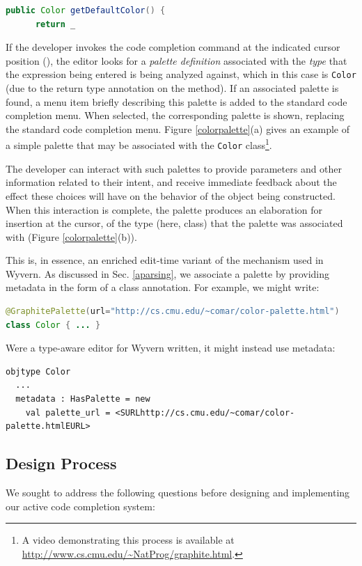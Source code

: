 \begin{lstlisting}[language=Java]
  public Color getDefaultColor() {
      return _
\end{lstlisting}

If the developer invokes the code completion command at the indicated cursor position (\li{_}), the editor  looks  for a {\it palette definition} associated with the {\it type} that the expression being entered is being analyzed against, which in this case is  \verb|Color| (due to the return type annotation on the method). If an associated palette is found, a menu item briefly describing this palette is added to the standard code completion menu. When selected, the corresponding palette is shown, replacing the standard code completion menu. Figure \ref{colorpalette}(a) gives an example of a simple palette that may be associated with the \verb|Color| class\footnote{A video demonstrating this process is available at \url{http://www.cs.cmu.edu/~NatProg/graphite.html}.}. 

The developer can interact with such palettes to provide parameters and other information related to their intent, and receive immediate feedback about the effect these choices will have on the behavior of the object being constructed. When this interaction is complete, the palette produces an elaboration for insertion at the cursor, of the type (here, class) that the palette was associated with (Figure \ref{colorpalette}(b)).

This is, in essence, an enriched edit-time variant of the mechanism used in Wyvern. As discussed in Sec. \ref{aparsing}, we associate a palette by providing metadata in the form of a class annotation. For example, we might write:
\begin{lstlisting}[language=Java]
@GraphitePalette(url="http://cs.cmu.edu/~comar/color-palette.html")
class Color { ... }
\end{lstlisting}

Were a type-aware editor for Wyvern written, it might instead use metadata:
\begin{lstlisting}
objtype Color
  ...
  metadata : HasPalette = new
    val palette_url = <SURLhttp://cs.cmu.edu/~comar/color-palette.htmlEURL>
\end{lstlisting}

\subsection{Design Process}
We sought to address the following questions before designing and implementing our active code completion system:

